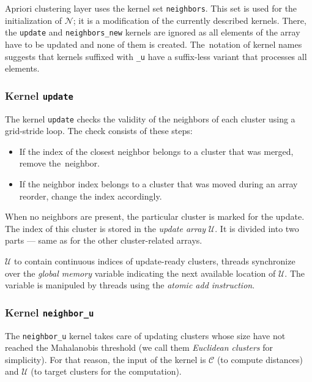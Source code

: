 Apriori clustering layer uses the kernel set \texttt{neighbors}. This set is used for the initialization of $\mathcal{N}$; it is a modification of the currently described kernels. There, the \texttt{update} and \texttt{neighbors\_new} kernels are ignored as all elements of the array have to be updated and none of them is created. The~notation of kernel names suggests that kernels suffixed with \texttt{\_u} have a suffix-less variant that processes all elements.

\subsubsection{Kernel \texttt{update}}
The kernel \texttt{update} checks the validity of the neighbors of each cluster using a grid-stride loop. The check consists of these steps:
\begin{itemize}
	\item If the index of the closest neighbor belongs to a cluster that was merged, remove the~neighbor.
	\item If the neighbor index belongs to a cluster that was moved during an array reorder, change the index accordingly.
\end{itemize} 
When no neighbors are present, the particular cluster is marked for the update. The index of this cluster is stored in the \emph{update array} $\mathcal{U}$. It is divided into two parts --- same as for the other cluster-related arrays. 

$\mathcal{U}$ to contain continuous indices of update-ready clusters, threads synchronize over the \emph{global memory} variable indicating the next available location of $\mathcal{U}$. The variable is manipuled by threads using the \emph{atomic add instruction}.

\subsubsection{Kernel \texttt{neighbor\_u}}

The \texttt{neighbor\_u} kernel takes care of updating clusters whose size have not reached the Mahalanobis threshold (we call them \emph{Euclidean clusters} for simplicity). For that reason, the input of the kernel is $\mathcal{C}$ (to compute distances) and $\mathcal{U}$ (to target clusters for the computation).


